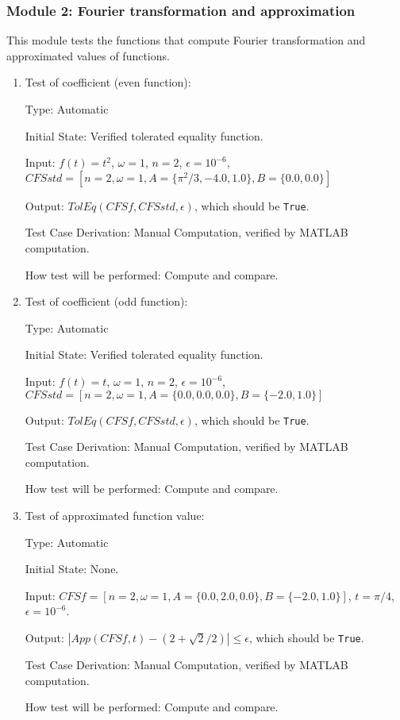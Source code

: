 \documentclass[12pt, titlepage]{article}
\newcommand{\li}[1]{\texttt{#1}}
\begin{document}
\subsubsection{Module 2: Fourier transformation and approximation}
This module tests the functions that compute Fourier transformation and approximated values of functions.

\begin{enumerate}
	\item{Test of coefficient (even function):\\}
	
	Type: Automatic
	
	Initial State: Verified tolerated equality function.
	
	Input: $f(t)=t^2$, $\omega=1$, $n=2$, $\epsilon=10^{-6}$, $\mathit{CFSstd}=[n=2,\omega=1, A=\{\pi^2/3, -4.0, 1.0\}, B=\{0.0, 0.0\}]$
	
	Output: $\mathit{TolEq}(\mathit{CFSf}, \mathit{CFSstd}, \epsilon)$, which should be \li{True}.
	
	Test Case Derivation: Manual Computation, verified by MATLAB computation.
	
	How test will be performed: Compute and compare.
	
	\item{Test of coefficient (odd function):\\}
	
	Type: Automatic	
	
	Initial State: Verified tolerated equality function.
	
	Input: $f(t)=t$, $\omega=1$, $n=2$, $\epsilon=10^{-6}$, $\mathit{CFSstd}=[n=2,\omega=1, A=\{0.0, 0.0, 0.0\}, B=\{-2.0, 1.0\}]$
	
	Output: $\mathit{TolEq}(\mathit{CFSf}, \mathit{CFSstd}, \epsilon)$, which should be \li{True}.
	
	Test Case Derivation: Manual Computation, verified by MATLAB computation.
	
	How test will be performed: Compute and compare.
	
	\item{Test of approximated function value: \\}
	
	Type: Automatic
	
	Initial State: None.
	
	Input: $\mathit{CFSf}=[n=2,\omega=1, A=\{0.0, 2.0, 0.0\}, B=\{-2.0, 1.0\}]$, $t=\pi/4$, $\epsilon=10^{-6}$.
	
	Output: $|\mathit{App}(\mathit{CFSf}, t)-(2+\sqrt{2}/2)|\leq\epsilon$, which should be \li{True}.
	
	Test Case Derivation: Manual Computation, verified by MATLAB computation.
	
	How test will be performed: Compute and compare.
	
\end{enumerate}
\end{document}
